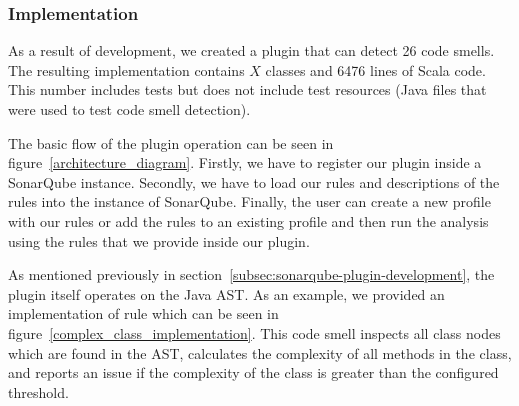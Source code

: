 
\subsubsection{Implementation}\label{subsec:implementation}

As a result of development, we created a plugin that can detect 26 code smells.
The resulting implementation contains $X$ classes and 6476 lines of Scala code.
This number includes tests but does not include test resources (Java files that were
used to test code smell detection).

The basic flow of the plugin operation can be seen in figure~\ref{architecture_diagram}.
Firstly, we have to register our plugin inside a SonarQube instance.
Secondly, we have to load our rules and descriptions of the rules into the instance of SonarQube.
Finally, the user can create a new profile with our rules or add the rules to an existing
profile and then run the analysis using the rules that we provide inside our plugin.

As mentioned previously in section~\ref{subsec:sonarqube-plugin-development}, the plugin itself operates on the Java
AST\@.
As an example, we provided an implementation of  rule which can be seen in figure~\ref{complex_class_implementation}.
This code smell inspects all class nodes which are found in the AST, calculates the complexity of all methods
in the class, and reports an issue if the complexity of the class is greater than the configured threshold.

